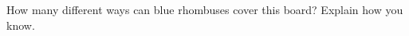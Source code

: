 \documentclass[12pt]{extarticle}
\begin{document}

\newpage
\prob How many different ways can blue rhombuses  cover this board? Explain how you know.

\vspace{14pt}
\begin{minipage}[t]{4.3in}
\vspace{0pt}
\end{minipage}%
\begin{minipage}[t]{3.2in}
\vspace{0pt}
\end{minipage}

\vspace{6pt}
\end{document}
